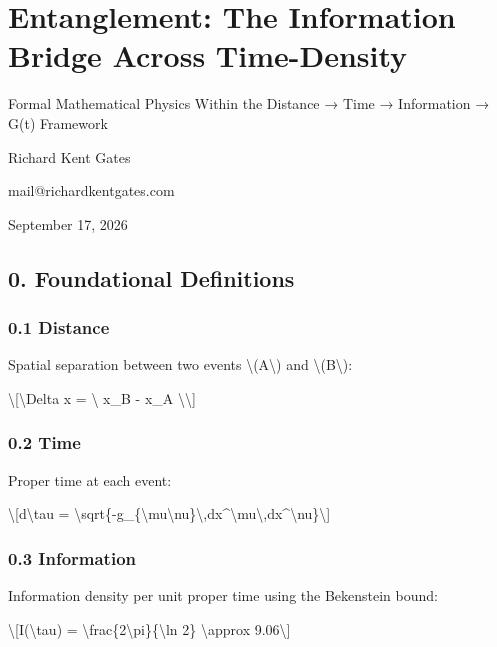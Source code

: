 \documentclass[
  10pt,
]{article}
\author{}
\date{}
\begin{document}
\hypertarget{entanglement-the-information-bridge-across-time-density}{%
\section{Entanglement: The Information Bridge Across
Time-Density}\label{entanglement-the-information-bridge-across-time-density}}

Formal Mathematical Physics Within the Distance → Time → Information →
G(t) Framework

Richard Kent Gates

mail@richardkentgates.com

September 17, 2026

\hypertarget{foundational-definitions}{%
\subsection{0. Foundational
Definitions}\label{foundational-definitions}}

\hypertarget{distance}{%
\subsubsection{0.1 Distance}\label{distance}}

Spatial separation between two events \textbackslash(A\textbackslash)
and \textbackslash(B\textbackslash):

\textbackslash{[}\textbackslash Delta x = \textbackslash\textbar{} x\_B
- x\_A \textbackslash\textbar\textbackslash{]}

\hypertarget{time}{%
\subsubsection{0.2 Time}\label{time}}

Proper time at each event:

\textbackslash{[}d\textbackslash tau =
\textbackslash sqrt\{-g\_\{\textbackslash mu\textbackslash nu\}\textbackslash,dx\^{}\textbackslash mu\textbackslash,dx\^{}\textbackslash nu\}\textbackslash{]}

\hypertarget{information}{%
\subsubsection{0.3 Information}\label{information}}

Information density per unit proper time using the Bekenstein bound:

\textbackslash{[}I(\textbackslash tau) =
\textbackslash frac\{2\textbackslash pi\}\{\textbackslash ln 2\}
\textbackslash approx 9.06\textbackslash{]}
\end{document}
